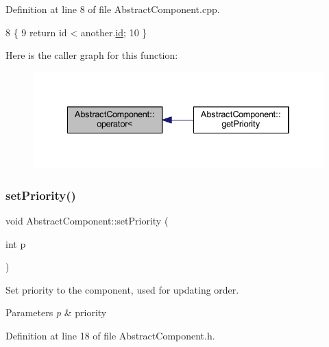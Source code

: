 Definition at line 8 of file Abstract\+Component.\+cpp.


\begin{DoxyCode}
8                                                                         \{
9     \textcolor{keywordflow}{return} \textcolor{keywordtype}{id} < another.\hyperlink{class_abstract_component_a9c9c548149681b1a1dd935e66ed5dd11}{id};
10 \}
\end{DoxyCode}
Here is the caller graph for this function\+:
\nopagebreak
\begin{figure}[H]
\begin{center}
\leavevmode
\includegraphics[width=334pt]{class_abstract_component_a0c2e458144111c5f599c66f168516abc_icgraph}
\end{center}
\end{figure}
\mbox{\label{class_abstract_component_a58a59a9ea6c3b4c86fb3bf98ff1eaaef}} 
\subsubsection{\texorpdfstring{set\+Priority()}{setPriority()}}
{\footnotesize\ttfamily void Abstract\+Component\+::set\+Priority (\begin{DoxyParamCaption}\item[{int}]{p }\end{DoxyParamCaption})\hspace{0.3cm}{\ttfamily [inline]}}



Set priority to the component, used for updating order. 


\begin{DoxyParams}{Parameters}
{\em p} & priority \\
\hline
\end{DoxyParams}


Definition at line 18 of file Abstract\+Component.\+h.



